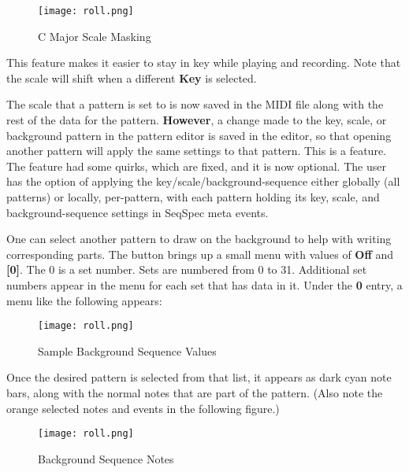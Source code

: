 \begin{figure}[H]
   \centering 
   \texttt{[image: roll.png]}
   \caption{C Major Scale Masking}
   \label{fig:pattern_editor_major_scale_masking}
\end{figure}

   This feature makes it easier to stay in key while playing and
   recording.  Note that the scale will shift when a different
   \textbf{Key} is selected.

   The scale that a pattern is set to is
   now saved in the MIDI file along with the rest of the data for the pattern.
   \textbf{However},
   a change made to the key, scale, or background pattern in
   the pattern editor is saved in the editor, so that opening another pattern
   will apply the same settings to that pattern.  This is a feature.
   The feature had some quirks, which are fixed, and it is now optional.
   The user has the option of applying the key/scale/background-sequence
   either globally (all patterns) or locally, per-pattern, with each pattern
   holding its key, scale, and background-sequence settings in
   SeqSpec meta events.

   One can select another pattern to draw on the background to help with
   writing corresponding parts.
   The button brings up a small menu with values of \textbf{Off} and
   \textbf{[0]}.  The 0 is a set number. Sets are numbered from 0 to 31.
   Additional set numbers appear in the menu for each set that has data in it.
   Under the \textbf{0}
   entry, a menu like the following appears:

\begin{figure}[H]
   \centering 
   \texttt{[image: roll.png]}
   \caption{Sample Background Sequence Values}
   \label{fig:pattern_editor_background_sequence_menu}
\end{figure}

   Once the desired pattern is selected from that list, it appears as dark cyan
   note bars, along with the normal notes that are part of the pattern.  (Also
   note the orange selected notes and events in the following figure.)

\begin{figure}[H]
   \centering 
   \texttt{[image: roll.png]}
   \caption{Background Sequence Notes}
   \label{fig:pattern_editor_background_sequence_notes}
\end{figure}

